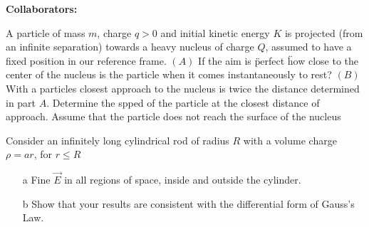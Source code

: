 \documentclass[11pt,letterpaper,boxed]{hmcpset}
\begin{document}
\noindent\textbf{Collaborators:} 


\begin{problem}
A particle of mass $m$, charge $q > 0$ and initial kinetic energy $K$ is projected (from an infinite separation) towards a heavy nucleus of charge $Q$, assumed to have a fixed position in our reference frame. $(A)$ If the aim is \" perfect \" how close to the center of the nucleus is the particle when it comes instantaneously to rest? $(B)$ With a particles closest approach to the nucleus is twice the distance determined in part $A$. Determine the spped of the particle at the closest distance of approach. Assume that the particle does not reach the surface of the nucleus
\end{problem}

\begin{solution}
\vfill
\end{solution}
\newpage

\begin{problem}[2.]
Consider an infinitely long cylindrical rod of radius $R$ with a volume charge $\rho = a r $, for $r \leq R$ 
\begin{enumerate}
\item[a] Fine $\vec{E}$ in all regions of space, inside and outside the cylinder. 
\item[b] Show that your results are consistent with the differential form of Gauss's Law. 
\end{enumerate}

\end{problem}

\begin{solution}
\vfill
\end{solution}
\newpage
\end{document}
